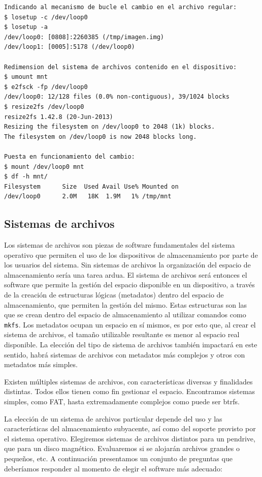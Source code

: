\begin{lstlisting}
Indicando al mecanismo de bucle el cambio en el archivo regular: 
$ losetup -c /dev/loop0
$ losetup -a
/dev/loop0: [0808]:2260385 (/tmp/imagen.img)
/dev/loop1: [0005]:5178 (/dev/loop0)

Redimension del sistema de archivos contenido en el dispositivo: 
$ umount mnt
$ e2fsck -fp /dev/loop0
/dev/loop0: 12/128 files (0.0% non-contiguous), 39/1024 blocks
$ resize2fs /dev/loop0
resize2fs 1.42.8 (20-Jun-2013)
Resizing the filesystem on /dev/loop0 to 2048 (1k) blocks.
The filesystem on /dev/loop0 is now 2048 blocks long.

Puesta en funcionamiento del cambio: 
$ mount /dev/loop0 mnt
$ df -h mnt/
Filesystem      Size  Used Avail Use% Mounted on
/dev/loop0      2.0M   18K  1.9M   1% /tmp/mnt

\end{lstlisting}

\subsection{Sistemas de archivos}

Los sistemas de archivos son piezas de software fundamentales del sistema operativo que 
permiten el uso de los dispositivos de almacenamiento por parte de los usuarios
del sistema. Sin sistemas de archivos la organización del espacio de almacenamiento sería una tarea ardua. El sistema de archivos será entonces el software que 
permite la gestión del espacio disponible en un dispositivo, a través de la 
creación de estructuras lógicas (metadatos) dentro del espacio de almacenamiento, que permiten la gestión del mismo. Estas estructuras son las que se crean 
dentro del espacio de almacenamiento al utilizar comandos como \lstinline$mkfs$. Los metadatos ocupan un espacio en sí mismos, es por esto que, al crear
el sistema de archivos, el tamaño utilizable resultante es menor al espacio
real disponible. La elección del tipo de sistema de archivos también 
impactará en este sentido, habrá sistemas de archivos con metadatos más 
complejos y otros con metadatos más simples. 

Existen múltiples sistemas de archivos, con características diversas y finalidades distintas. Todos ellos tienen como fin gestionar el espacio. Encontramos sistemas simples, como FAT, hasta extremadamente complejos como puede ser btrfs. 

La elección de un sistema de archivos particular depende del uso y las
características del almacenamiento subyacente, así como del soporte provisto
por el sistema operativo. Elegiremos sistemas de archivos
distintos para un pendrive, que para un disco magnético. Evaluaremos si 
se alojarán archivos grandes o pequeños, etc. A continuación presentamos un 
conjunto de preguntas que deberíamos responder al momento de elegir 
el software más adecuado: 

